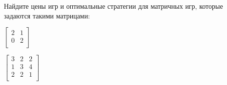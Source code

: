 Найдите цены игр и оптимальные стратегии для матричных игр, которые задаются такими матрицами:
\begin{enumcyr}
    \item
        $\begin{bmatrix}
            2 & 1 \\
            0 & 2 \\
        \end{bmatrix}$
        \vspace{0.1cm}
    \item
        $\begin{bmatrix}
            3 & 2 & 2 \\
            1 & 3 & 4 \\
            2 & 2 & 1 \\
        \end{bmatrix}$
\end{enumcyr}